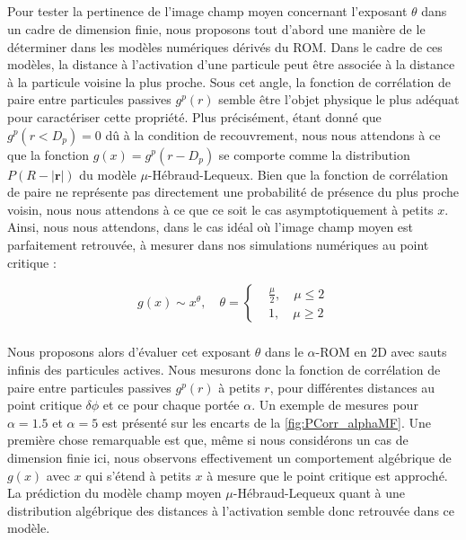 \subparagraph{}Pour tester la pertinence de l'image champ moyen concernant l'exposant $\theta$ dans un cadre de dimension finie, nous proposons tout d'abord une manière de le déterminer dans les modèles numériques dérivés du ROM. Dans le cadre de ces modèles, la distance à l'activation d'une particule peut être associée à la distance à la particule voisine la plus proche. Sous cet angle, la fonction de corrélation de paire entre particules passives $g^p(r)$ semble être l'objet physique le plus adéquat pour caractériser cette propriété. Plus précisément, étant donné que $g^p(r<D_p)=0$ dû à la condition de recouvrement, nous nous attendons à ce que la fonction $g(x) = g^p(r-D_p)$ se comporte comme la distribution $P(R-|\mathbf{r}|)$ du modèle $\mu$-Hébraud-Lequeux. Bien que la fonction de corrélation de paire ne représente pas directement une probabilité de présence du plus proche voisin, nous nous attendons à ce que ce soit le cas asymptotiquement à petits $x$. Ainsi, nous nous attendons, dans le cas idéal où l'image champ moyen est parfaitement retrouvée, à mesurer dans nos simulations numériques au point critique :

\begin{equation}
	g(x) \sim x^\theta, \quad \theta = \left\{
	\begin{aligned}
	&\frac{\mu}{2}, \quad \mu \leq 2\\
	&1, \quad \mu \geq 2
	\end{aligned}
	\right.
	\label{eq:gpass}
\end{equation}

\subparagraph{}Nous proposons alors d'évaluer cet exposant $\theta$ dans le $\alpha$-ROM en 2D avec sauts infinis des particules actives. Nous mesurons donc la fonction de corrélation de paire entre particules passives $g^p(r)$ à petits $r$, pour différentes distances au point critique $\delta\phi$ et ce pour chaque portée $\alpha$. Un exemple de mesures pour $\alpha = 1.5$ et $\alpha = 5$ est présenté sur les encarts de la \autoref{fig:PCorr_alphaMF}. Une première chose remarquable est que, même si nous considérons un cas de dimension finie ici, nous observons effectivement un comportement algébrique de $g(x)$ avec $x$ qui s'étend à petits $x$ à mesure que le point critique est approché. La prédiction du modèle champ moyen $\mu$-Hébraud-Lequeux quant à une distribution algébrique des distances à l'activation semble donc retrouvée dans ce modèle.

